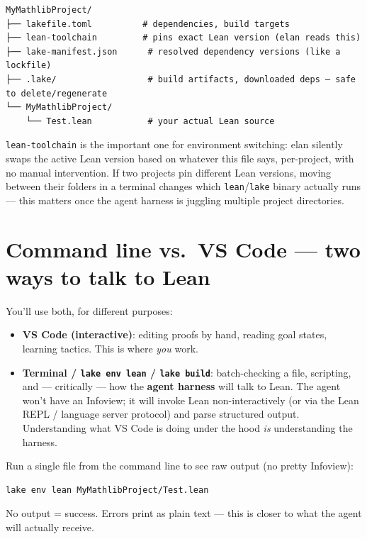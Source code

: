 \begin{verbatim}
MyMathlibProject/
├── lakefile.toml          # dependencies, build targets
├── lean-toolchain         # pins exact Lean version (elan reads this)
├── lake-manifest.json      # resolved dependency versions (like a lockfile)
├── .lake/                  # build artifacts, downloaded deps — safe to delete/regenerate
└── MyMathlibProject/
    └── Test.lean           # your actual Lean source
\end{verbatim}

\texttt{lean-toolchain} is the important one for environment switching: elan silently swaps the active Lean version based on whatever this file says, per-project, with no manual intervention. If two projects pin different Lean versions, moving between their folders in a terminal changes which \texttt{lean}/\texttt{lake} binary actually runs --- this matters once the agent harness is juggling multiple project directories.

\section{Command line vs.\ VS Code --- two ways to talk to Lean}

You'll use both, for different purposes:

\begin{itemize}
  \item \textbf{VS Code (interactive)}: editing proofs by hand, reading goal states, learning tactics. This is where \emph{you} work.
  \item \textbf{Terminal / \texttt{lake env lean} / \texttt{lake build}}: batch-checking a file, scripting, and --- critically --- how the \textbf{agent harness} will talk to Lean. The agent won't have an Infoview; it will invoke Lean non-interactively (or via the Lean REPL / language server protocol) and parse structured output. Understanding what VS Code is doing under the hood \emph{is} understanding the harness.
\end{itemize}

Run a single file from the command line to see raw output (no pretty Infoview):

\begin{verbatim}
lake env lean MyMathlibProject/Test.lean
\end{verbatim}

No output = success. Errors print as plain text --- this is closer to what the agent will actually receive.

